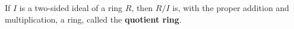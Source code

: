 If $I$ is a two-sided ideal of a ring $R$, then $R/I$ is, with the proper addition and multiplication, a ring, called the \textbf{quotient ring}.
